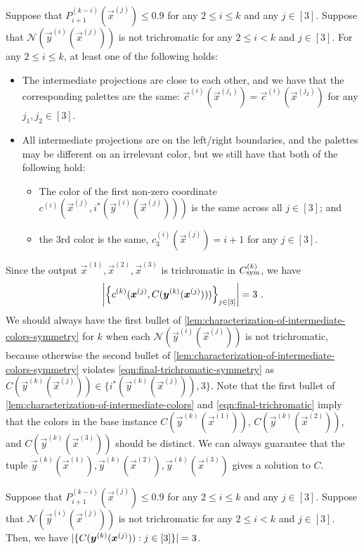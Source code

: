 \begin{lemma}
    \label{lem:characterization-of-intermediate-colors-symmetry}
    Suppose that $P_{i+1}^{(k-i)}(\vec{x}^{(j)})\leq 0.9$ for any $2\leq i\leq k$ and any $j\in [3]$.
    Suppose that $\mathcal{N}(\vec{y}^{(i)}(\vec{x}^{(j)}))$ is not trichromatic for any $2\leq i<k$ and $j\in [3]$. 
    For any $2\leq i\leq k$, at least one of the following holds:
    \begin{itemize}
        \item The intermediate projections are close to each other, and we have that the corresponding palettes are the same: $\vec{c}^{(i)}(\vec{x}^{(j_1)})=\vec{c}^{(i)}(\vec{x}^{(j_2)})$ for any $j_1,j_2\in [3]$.
        \item All intermediate projections are on the left/right boundaries, and the palettes may be different on an irrelevant color, but we still have that both of the following hold: 
        \begin{itemize}
            \item The color of the first non-zero coordinate $c^{(i)}\left(\vec{x}^{(j)}, i^*(\vec{y}^{(i)}(\vec{x}^{(j)}))\right)$ is the same across all  $j\in [3]$; and
            \item the 3rd color is the same, $c^{(i)}_3(\vec{x}^{(j)})=i+1$ for any $j\in [3]$.
        \end{itemize} 
    \end{itemize}
\end{lemma}

Since the output $\vec{x}^{(1)}, \vec{x}^{(2)}, \vec{x}^{(3)}$ is trichromatic in $C_{\rm sym}^{(k)}$, we have 
\begin{align}
    \label{eqn:final-trichromatic-symmetry}
    \left |{\left \{{c^{(k)}(\boldsymbol{x}^{(j)},C(\boldsymbol{y}^{(k)}(\boldsymbol{x}^{(j)})))} \right \}_{j\in [3]}} \right |=3~.
\end{align}
We should always have the first bullet of \cref{lem:characterization-of-intermediate-colors-symmetry} for $k$ when each $\mathcal{N}(\vec{y}^{(i)}(\vec{x}^{(j)}))$ is not trichromatic, because otherwise the second bullet of \cref{lem:characterization-of-intermediate-colors-symmetry} violates \cref{eqn:final-trichromatic-symmetry} as $C(\vec{y}^{(k)}(\vec{x}^{(j)}))\in \{i^*(\vec{y}^{(k)}(\vec{x}^{(j)})), 3\}$.
Note that
the first bullet of \cref{lem:characterization-of-intermediate-colors} and \cref{eqn:final-trichromatic} imply that the colors in the base instance $C(\vec{y}^{(k)}(\vec{x}^{(1)}))$, $C(\vec{y}^{(k)}(\vec{x}^{(2)}))$, and $C(\vec{y}^{(k)}(\vec{x}^{(3)}))$ should be distinct. 
We can always guarantee that the tuple $\vec{y}^{(k)}(\vec{x}^{(1)}), \vec{y}^{(k)}(\vec{x}^{(2)}), \vec{y}^{(k)}(\vec{x}^{(3)})$ gives a solution to $C$.
\begin{corollary}
    \label{cor:no-sols-in-sim-implies-final-ones-symmetry}
    Suppose that $P_{i+1}^{(k-i)}(\vec{x}^{(j)})\leq 0.9$ for any $2\leq i\leq k$ and any $j\in [3]$.
    Suppose that $\mathcal{N}(\vec{y}^{(i)}(\vec{x}^{(j)}))$ is not trichromatic for any $2\leq i<k$ and $j\in [3]$. 
    Then, we have $|\{{C(\boldsymbol{y}^{(k)}(\boldsymbol{x}^{(j)})): j\in [3]} \}|=3$.
\end{corollary}

